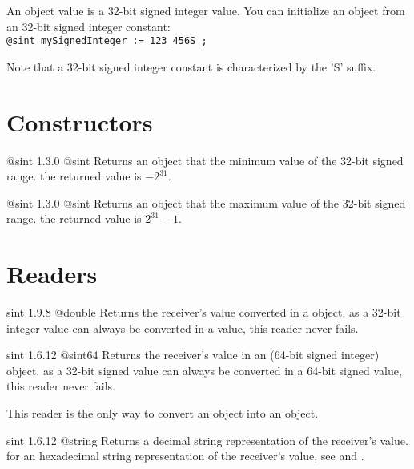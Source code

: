

An  object value is a 32-bit signed integer value. You can initialize an  object from an 32-bit signed integer constant:\\

\texttt{@sint mySignedInteger := 123\_456S ;}

Note that a 32-bit signed integer constant is characterized by the 'S' suffix.


\section{Constructors}

{@sint}
{1.3.0}
{@sint}
{Returns an  object that the minimum value of the 32-bit signed range.}
{the returned value is $-2^{31}$.}





{@sint}
{1.3.0}
{@sint}
{Returns an  object that the maximum value of the 32-bit signed range.}
{the returned value is $2^{31}-1$.}



\section{Readers}

{sint}
{1.9.8}
{@double}
{Returns the receiver's value converted in a  object.}
{as a 32-bit integer value can always be converted in a  value, this reader never fails.}





{sint}
{1.6.12}
{@sint64}
{Returns the receiver's value in an  (64-bit signed integer) object.}
{as a 32-bit signed value can always be converted in a 64-bit signed value, this reader never fails.}

This reader is the only way to convert an  object into an  object.





{sint}
{1.6.12}
{@string}
{Returns a decimal string representation of the receiver's value.}
{for an hexadecimal string representation of the receiver's value, see  and .}







